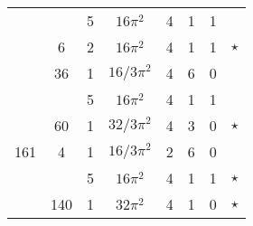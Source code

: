 \documentclass[12pt]{amsart}
\providecommand{\DIFadd}[1]{{\protect\color{blue}\uwave{#1}}} %
\providecommand{\DIFdel}[1]{{\protect\color{red}\sout{#1}}}                      %
\providecommand{\DIFaddbegin}{} %
\providecommand{\DIFaddend}{} %
\providecommand{\DIFdelbegin}{} %
\providecommand{\DIFdelend}{} %
\begin{document}
\begin{tabular}{ccc|ccccc}
 &  & 5 & $16\pi^2$ & 4 & 1 & 1 &  \\
 & 6 & 2 & $16\pi^2$ & 4 & 1 & 1 & $\star$ \\
 & 36 & 1 & \DIFdelbegin \DIFdel{$16/3\pi^2$ }\DIFdelend \DIFaddbegin \DIFadd{$(16/3)\pi^2$ }\DIFaddend & 4 & 6 & 0 &  \\
 &  & 5 & $16\pi^2$ & 4 & 1 & 1 &  \\
 & 60 & 1 & \DIFdelbegin \DIFdel{$32/3\pi^2$ }\DIFdelend \DIFaddbegin \DIFadd{$(32/3)\pi^2$ }\DIFaddend & 4 & 3 & 0 & $\star$ \\
161 & 4 & 1 & \DIFdelbegin \DIFdel{$16/3\pi^2$ }\DIFdelend \DIFaddbegin \DIFadd{$(16/3)\pi^2$ }\DIFaddend & 2 & 6 & 0 &  \\
 &  & 5 & $16\pi^2$ & 4 & 1 & 1 & $\star$ \\
 & 140 & 1 & $32\pi^2$ & 4 & 1 & 0 & $\star$ \DIFaddbegin \\
\DIFaddend \end{tabular}
\end{document}
